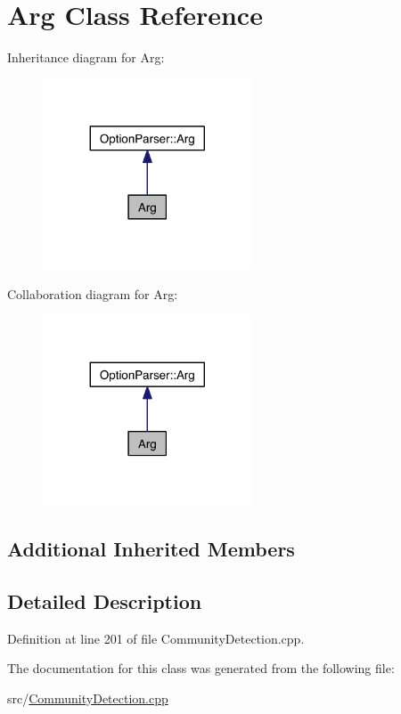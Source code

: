 \hypertarget{class_arg}{\section{Arg Class Reference}
\label{class_arg}
}


Inheritance diagram for Arg\-:\nopagebreak
\begin{figure}[H]
\begin{center}
\leavevmode
\includegraphics[width=176pt]{class_arg__inherit__graph}
\end{center}
\end{figure}


Collaboration diagram for Arg\-:\nopagebreak
\begin{figure}[H]
\begin{center}
\leavevmode
\includegraphics[width=176pt]{class_arg__coll__graph}
\end{center}
\end{figure}
\subsection*{Additional Inherited Members}


\subsection{Detailed Description}


Definition at line 201 of file Community\-Detection.\-cpp.



The documentation for this class was generated from the following file\-:\begin{DoxyCompactItemize}
\item 
src/\hyperlink{_community_detection_8cpp}{Community\-Detection.\-cpp}\end{DoxyCompactItemize}
